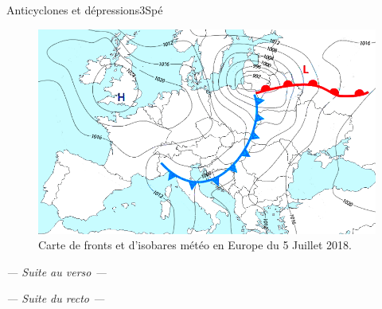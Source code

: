 \begin{exercise}{Anticyclones et dépressions}{3}{Spé}
\begin{questions}
    \end{questions}
\begin{EnvUplevel}
\begin{figure}[H]
    \centering
    \vspace{-1em}
    \includegraphics[width=0.9\linewidth]{mecaflu/meteo.png}
    \caption{Carte de fronts et d'isobares météo en Europe du 5 Juillet 2018.}
    \label{fig:my_label}
\end{figure}
\end{EnvUplevel}

\begin{center}
    \vspace{-1.5em}
    \itshape --- \quad Suite au verso \quad ---
\end{center}
\end{exercise}

\pagebreak

\printexerciseheader

\begin{center}
    \itshape --- \quad Suite du recto \quad ---
\end{center}

\bigskip

